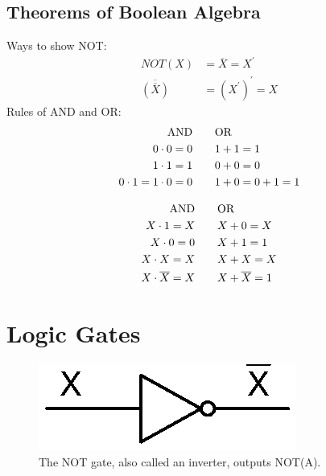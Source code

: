 \subsection{Theorems of Boolean Algebra}
Ways to show NOT:
\begin{subequations}
	\begin{align}
	NOT(X) &= \overline{X} = X^{\prime} \\
	\overline{(\overline{X})} &= \left(X^{\prime}\right)^{\prime}= X
	\end{align}
\end{subequations}
Rules of AND and OR:
\begin{subequations}
	\begin{align}
	\mathrm{AND} \qquad & \mathrm{OR}\notag\\
	0\cdot0 = 0 \qquad & 1+1 = 1\\
	1\cdot1 = 1 \qquad & 0+0 = 0\\
	0\cdot1 = 1\cdot0 = 0 \qquad & 1 + 0 = 0 + 1 = 1
	\end{align}
\end{subequations}

\begin{subequations}
	\begin{align}
	\mathrm{AND} \qquad & \mathrm{OR}\notag\\
	X\cdot1 = X \qquad & X + 0 = X\\	
	X\cdot0 = 0 \qquad & X + 1 = 1\\	
	X\cdot X = X \qquad & X + X = X\\	
	X\cdot\overline{X} = X \qquad & X + \overline{X} = 1\\
	\end{align}
\end{subequations}

\section{Logic Gates}
\begin{figure}[!htb]
	\centering
	\includegraphics[scale=0.7]{logic/NOT.eps}
	\caption{The NOT gate, also called an inverter, outputs NOT(A).}
	\label{fig:notgate}
\end{figure} 

